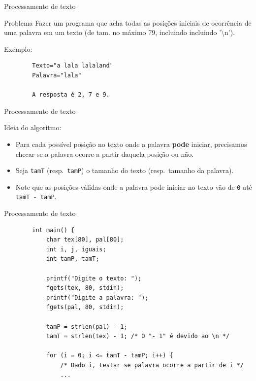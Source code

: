 \documentclass[handout]{beamer}
\newcommand{\cod}[1]{\texttt{#1}}
\begin{document}
\begin{frame}[fragile]{Processamento de texto}
    
    \begin{block}{Problema}
        Fazer um programa que acha todas as posições iniciais de ocorrência de uma palavra em um texto (de tam. no máximo 79, incluindo incluindo '\textbackslash{n}').
    \end{block}

    Exemplo:
    \begin{verbatim}
        Texto="a lala lalaland"
        Palavra="lala"

        A resposta é 2, 7 e 9.
    \end{verbatim}

\end{frame}

\begin{frame}[fragile]{Processamento de texto}

    Ideia do algoritmo:
    \begin{itemize}[<+->]
        \item Para cada possível posição no texto onde a palavra \textbf{pode} iniciar, precisamos checar se a palavra ocorre a partir daquela posição ou não.
        \item Seja \cod{tamT} (resp.\ \cod{tamP}) o tamanho do texto (resp.\ tamanho da palavra).
        \item Note que as posições válidas onde a palavra pode iniciar no texto vão de \cod{0} até \cod{tamT - tamP}.
    \end{itemize}

\end{frame}

\begin{frame}[fragile]{Processamento de texto}

    \begin{verbatim}
        int main() {
            char tex[80], pal[80];
            int i, j, iguais;
            int tamP, tamT;

            printf("Digite o texto: ");
            fgets(tex, 80, stdin);
            printf("Digite a palavra: ");
            fgets(pal, 80, stdin);

            tamP = strlen(pal) - 1;
            tamT = strlen(tex) - 1; /* O "- 1" é devido ao \n */

            for (i = 0; i <= tamT - tamP; i++) {
                /* Dado i, testar se palavra ocorre a partir de i */
                ...
    \end{verbatim}

\end{frame}
\end{document}
